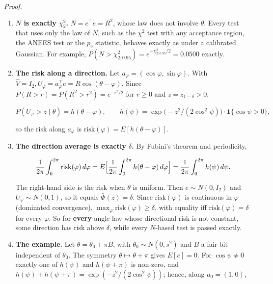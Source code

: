 \documentclass{ieeeaccess}
\begin{document}
\emph{Proof.}

\begin{enumerate}
\item[1.] \textbf{$N$ is exactly $\chi_{2}^{2}$.} $N = e^{\top}e = R^{2}$, whose law does not involve $\theta$. Every test that uses only the law of $N$, such as the $\chi^{2}$ test with any acceptance region, the ANEES test or the $p_{v}$ statistic, behaves exactly as under a calibrated Gaussian. For example, $P(N > \chi_{2;0.95}^{2}) = e^{-\chi_{2;0.95}^{2}/2} = 0.0500$ exactly.
\item[2.] \textbf{The risk along a direction.} Let $a_{\varphi} = (\cos \varphi, \sin \varphi)$. With $\hat{V} = I_{2}, U_{\varphi} = a_{\varphi}^{\top}e = R \cos(\theta - \varphi)$. Since $P(R > r) = P(R^{2} > r^{2}) = e^{-r^{2}/2}$ for $r \geq 0$ and $z = z_{1-\delta} > 0$,

\begin{equation*}
P(U_\varphi > z \mid \theta) = h(\theta - \varphi), \qquad h(\psi) = \exp\bigl(-z^2/(2\cos^2\psi)\bigr)\cdot\mathbf{1}\{\cos\psi > 0\},
\end{equation*}

so the risk along $a_{\varphi}$ is $\mathrm{risk}(\varphi) = E[h(\theta - \varphi)]$.
\item[3.] \textbf{The direction average is exactly $\delta$.} By Fubini's theorem and periodicity,

\begin{equation*}
\frac{1}{2\pi}\int_0^{2\pi} \mathrm{risk}(\varphi)\,d\varphi = E\Bigl[\frac{1}{2\pi}\int_0^{2\pi} h(\theta - \varphi)\,d\varphi\Bigr] = \frac{1}{2\pi}\int_0^{2\pi} h(\psi)\,d\psi.
\end{equation*}

The right-hand side is the risk when $\theta$ is uniform. Then $e \sim N(0, I_{2})$ and $U_{\varphi} \sim N(0, 1)$, so it equals $\bar{\Phi}(z) = \delta$. Since $\mathrm{risk}(\varphi)$ is continuous in $\varphi$ (dominated convergence), $\max_{\varphi} \mathrm{risk}(\varphi) \geq \delta$, with equality iff $\mathrm{risk}(\varphi) = \delta$ for every $\varphi$. So for \textbf{every} angle law whose directional risk is not constant, some direction has risk above $\delta$, while every $N$-based test is passed exactly.
\item[4.] \textbf{The example.} Let $\theta = \theta_{0} + \pi B$, with $\theta_{0} \sim N(0, s^{2})$ and $B$ a fair bit independent of $\theta_{0}$. The symmetry $\theta \mapsto \theta + \pi$ gives $E[e] = 0$. For $\cos \psi \neq 0$ exactly one of $h(\psi)$ and $h(\psi + \pi)$ is non-zero, and $h(\psi) + h(\psi + \pi) = \exp(-z^{2}/(2\cos^{2}\psi))$; hence, along $a_{0} = (1, 0)$,


\end{enumerate}
\end{document}
